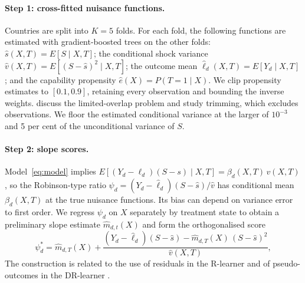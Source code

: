 \paragraph{Step 1: cross-fitted nuisance functions.} Countries are split into $K=5$ folds. For
each fold, the following functions are estimated with gradient-boosted trees on the other folds:
$\hat s(X,T)=E[S\mid X,T]$; the conditional shock variance $\hat v(X,T)=E[(S-\hat s)^2\mid X,T]$;
the outcome mean $\hat\ell_d(X,T)=E[Y_d\mid X,T]$; and the capability propensity
$\hat e(X)=P(T=1\mid X)$. We clip propensity estimates to $[0.1,0.9]$, retaining
every observation and bounding the inverse weights. \citet{crump2009} discuss the limited-overlap
problem and study trimming, which excludes observations. We floor the estimated conditional
variance at the larger of $10^{-3}$ and 5 per cent of the unconditional variance of $S$.

\paragraph{Step 2: slope scores.} Model~\eqref{eq:model} implies
$E[(Y_d-\ell_d)(S-s)\mid X,T]=\beta_d(X,T)\,v(X,T)$, so the Robinson-type ratio
$\psi_d=(Y_d-\hat\ell_d)(S-\hat s)/\hat v$ has conditional mean $\beta_d(X,T)$ at
the true nuisance functions. Its bias can depend on variance error to first order.
We regress $\psi_d$ on $X$ separately by treatment state to obtain a preliminary
slope estimate $\hat m_{d,t}(X)$ and form the orthogonalised score
\begin{equation}\label{eq:psistar}
\psi^{*}_d = \hat m_{d,T}(X) + \frac{(Y_d-\hat\ell_d)(S-\hat s) - \hat m_{d,T}(X)\,(S-\hat s)^2}{\hat v(X,T)} ,
\end{equation}
The construction is related to the use of residuals in the R-learner and of
pseudo-outcomes in the DR-learner \citep{nie2021,kennedy2023}.

